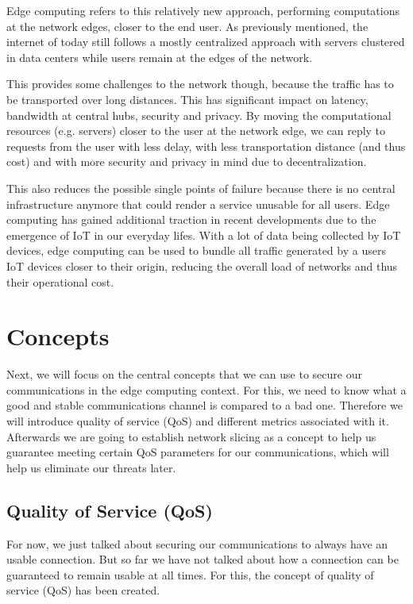 Edge computing \cite{edgecomputing} refers to this relatively new approach, performing computations at the network edges, closer to the end user. As previously mentioned, the internet of today still follows a mostly centralized approach with servers clustered in data centers while users remain at the edges of the network.

This provides some challenges to the network though, because the traffic has to be transported over long distances. This has significant impact on latency, bandwidth at central hubs, security and privacy. By moving the computational resources (e.g. servers) closer to the user at the network edge, we can reply to requests from the user with less delay, with less transportation distance (and thus cost) and with more security and privacy in mind due to decentralization.

This also reduces the possible single points of failure because there is no central infrastructure anymore that could render a service unusable for all users. Edge computing has gained additional traction in recent developments due to the emergence of IoT in our everyday lifes. With a lot of data being collected by IoT devices, edge computing can be used to bundle all traffic generated by a users IoT devices closer to their origin, reducing the overall load of networks and thus their operational cost.

\section{Concepts}
\label{bg_concepts}
Next, we will focus on the central concepts that we can use to secure our communications in the edge computing context. For this, we need to know what a good and stable communications channel is compared to a bad one. Therefore we will introduce quality of service (QoS) and different metrics associated with it. Afterwards we are going to establish network slicing as a concept to help us guarantee meeting certain QoS parameters for our communications, which will help us eliminate our threats later.

\subsection{Quality of Service (QoS)}
For now, we just talked about securing our communications to always have an usable connection. But so far we have not talked about how a connection can be guaranteed to remain usable at all times. For this, the concept of quality of service (QoS) has been created.

